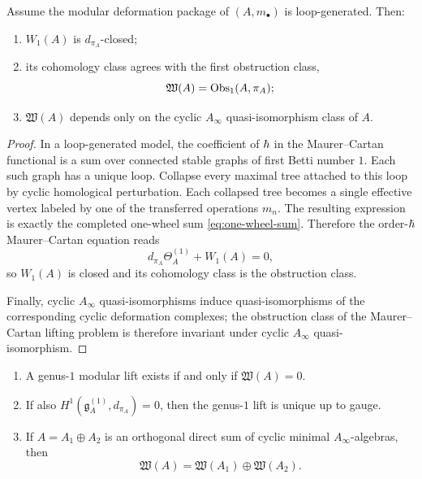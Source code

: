 \begin{theorem}
\label{thm:one-wheel-reduction}
Assume the modular deformation package of $(A,m_\bullet)$ is loop-generated. Then:
\begin{enumerate}[label=\textup{(\roman*)}]
\item $W_1(A)$ is $d_{\pi_A}$-closed;
\item its cohomology class agrees with the first obstruction class,
\[
\mathfrak W(A)=\operatorname{Obs}_1(A,\pi_A);
\]
\item $\mathfrak W(A)$ depends only on the cyclic $A_\infty$ quasi-isomorphism class of $A$.
\end{enumerate}
\end{theorem}

\begin{proof}
In a loop-generated model, the coefficient of $\hbar$ in the Maurer--Cartan functional is a sum
over connected stable graphs of first Betti number $1$. Each such graph has a unique loop.
Collapse every maximal tree attached to this loop by cyclic homological perturbation. Each
collapsed tree becomes a single effective vertex labeled by one of the transferred operations
$m_n$. The resulting expression is exactly the completed one-wheel sum \eqref{eq:one-wheel-sum}.
Therefore the order-$\hbar$ Maurer--Cartan equation reads
\[
d_{\pi_A}\Theta_A^{(1)}+W_1(A)=0,
\]
so $W_1(A)$ is closed and its cohomology class is the obstruction class.

Finally, cyclic $A_\infty$ quasi-isomorphisms induce quasi-isomorphisms of the corresponding
cyclic deformation complexes; the obstruction class of the Maurer--Cartan lifting problem is
therefore invariant under cyclic $A_\infty$ quasi-isomorphism.
\end{proof}

\begin{corollary}
\label{cor:vanishing-criterion-and-additivity}
\begin{enumerate}[label=\textup{(\roman*)}]
\item A genus-$1$ modular lift exists if and only if $\mathfrak W(A)=0$.
\item If also $H^1(\mathfrak g_A^{(1)},d_{\pi_A})=0$, then the genus-$1$ lift is unique up to
gauge.
\item If $A=A_1\oplus A_2$ is an orthogonal direct sum of cyclic minimal $A_\infty$-algebras,
then
\[
\mathfrak W(A)=\mathfrak W(A_1)\oplus\mathfrak W(A_2).
\]
\end{enumerate}
\end{corollary}

